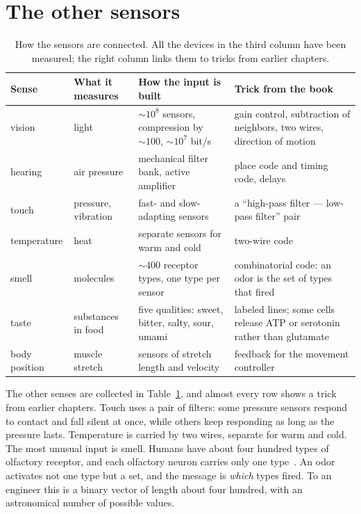 \section{The other sensors}

\begin{table}[t]
\centering
\footnotesize
\setlength{\tabcolsep}{3pt}
\renewcommand{\arraystretch}{1.15}
\begin{tabular}{>{\raggedright}p{1.9cm}>{\raggedright}p{2.6cm}>{\raggedright}p{4.0cm}>{\raggedright\arraybackslash}p{4.6cm}}
\toprule
Sense & What it measures & How the input is built & Trick from the book \\
\midrule
vision & light & $\sim10^8$ sensors, compression by $\sim100$, $\sim10^7$ bit/s & gain control, subtraction of neighbors, two wires, direction of motion \\
hearing & air pressure & mechanical filter bank, active amplifier & place code and timing code, delays \\
touch & pressure, vibration & fast- and slow-adapting sensors & a ``high-pass filter --- low-pass filter'' pair \\
temperature & heat & separate sensors for warm and cold & two-wire code \\
smell & molecules & $\sim400$ receptor types, one type per sensor & combinatorial code: an odor is the set of types that fired \\
taste & substances in food & five qualities: sweet, bitter, salty, sour, umami & labeled lines; some cells release ATP or serotonin rather than glutamate \\
body position & muscle stretch & sensors of stretch length and velocity & feedback for the movement controller \\
\bottomrule
\end{tabular}
\caption{How the sensors are connected. All the devices in the third column have been measured; the right column links them to tricks from earlier chapters.}
\label{tab:sensors}
\end{table}

The other senses are collected in Table~\ref{tab:sensors}, and almost every row shows a trick from earlier chapters. Touch uses a pair of filters: some pressure sensors respond to contact and fall silent at once, while others keep responding as long as the pressure lasts. Temperature is carried by two wires, separate for warm and cold. The most unusual input is smell. Humans have about four hundred types of olfactory receptor, and each olfactory neuron carries only one type~\cite{Mombaerts2004}. An odor activates not one type but a set, and the message is \emph{which} types fired. To an engineer this is a binary vector of length about four hundred, with an astronomical number of possible values.

